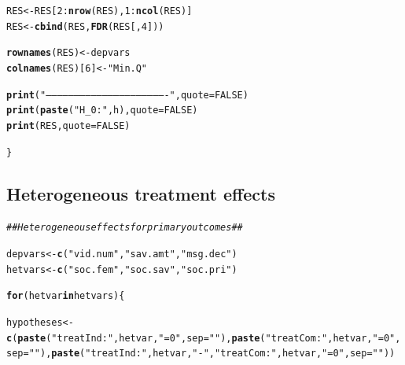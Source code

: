 \documentclass[11pt, a4paper]{article}\usepackage[]{graphicx}\usepackage[]{color}
\makeatletter
\newcommand{\hlnum}[1]{\textcolor[rgb]{0.686,0.059,0.569}{#1}}%
\newcommand{\hlstr}[1]{\textcolor[rgb]{0.192,0.494,0.8}{#1}}%
\newcommand{\hlcom}[1]{\textcolor[rgb]{0.678,0.584,0.686}{\textit{#1}}}%
\newcommand{\hlopt}[1]{\textcolor[rgb]{0,0,0}{#1}}%
\newcommand{\hlstd}[1]{\textcolor[rgb]{0.345,0.345,0.345}{#1}}%
\newcommand{\hlkwa}[1]{\textcolor[rgb]{0.161,0.373,0.58}{\textbf{#1}}}%
\newcommand{\hlkwb}[1]{\textcolor[rgb]{0.69,0.353,0.396}{#1}}%
\newcommand{\hlkwc}[1]{\textcolor[rgb]{0.333,0.667,0.333}{#1}}%
\newcommand{\hlkwd}[1]{\textcolor[rgb]{0.737,0.353,0.396}{\textbf{#1}}}%
\newenvironment{kframe}{%
 \def\at@end@of@kframe{}%
 \ifinner\ifhmode%
  \def\at@end@of@kframe{\end{minipage}}%
  \begin{minipage}{\columnwidth}%
 \fi\fi%
 \def\FrameCommand##1{\hskip\@totalleftmargin \hskip-\fboxsep
 \colorbox{shadecolor}{##1}\hskip-\fboxsep
     \hskip-\linewidth \hskip-\@totalleftmargin \hskip\columnwidth}%
 \MakeFramed {\advance\hsize-\width
   \@totalleftmargin\z@ \linewidth\hsize
   \@setminipage}}%
 {\par\unskip\endMakeFramed%
 \at@end@of@kframe}
\newenvironment{knitrout}{}{} %
\makeatother
\begin{document}
\begin{footnotesize}
\begin{knitrout}
\begin{kframe}
\begin{alltt}
        \hlstd{RES} \hlkwb{<-} \hlstd{RES[}\hlnum{2}\hlopt{:}\hlkwd{nrow}\hlstd{(RES),} \hlnum{1}\hlopt{:}\hlkwd{ncol}\hlstd{(RES)]}
        \hlstd{RES} \hlkwb{<-} \hlkwd{cbind}\hlstd{(RES,} \hlkwd{FDR}\hlstd{(RES[,} \hlnum{4}\hlstd{]))}

        \hlkwd{rownames}\hlstd{(RES)} \hlkwb{<-} \hlstd{depvars}
        \hlkwd{colnames}\hlstd{(RES)[}\hlnum{6}\hlstd{]} \hlkwb{<-} \hlstr{"Min. Q"}

        \hlkwd{print}\hlstd{(}\hlstr{"----------------------------------------------------------------"}\hlstd{,} \hlkwc{quote} \hlstd{=} \hlnum{FALSE}\hlstd{)}
        \hlkwd{print}\hlstd{(}\hlkwd{paste}\hlstd{(}\hlstr{"H_0:"}\hlstd{, h),} \hlkwc{quote} \hlstd{=} \hlnum{FALSE}\hlstd{)}
        \hlkwd{print}\hlstd{(RES,} \hlkwc{quote} \hlstd{=} \hlnum{FALSE}\hlstd{)}

    \hlstd{\}}
\end{alltt}
\end{kframe}
\end{knitrout}

    \subsection{Heterogeneous treatment effects}

\begin{knitrout}
\color{fgcolor}\begin{kframe}
\begin{alltt}
    \hlcom{## Heterogeneous effects for primary outcomes ##}

    \hlstd{depvars} \hlkwb{<-} \hlkwd{c}\hlstd{(}\hlstr{"vid.num"}\hlstd{,} \hlstr{"sav.amt"}\hlstd{,} \hlstr{"msg.dec"}\hlstd{)}
    \hlstd{hetvars} \hlkwb{<-} \hlkwd{c}\hlstd{(}\hlstr{"soc.fem"}\hlstd{,} \hlstr{"soc.sav"}\hlstd{,} \hlstr{"soc.pri"}\hlstd{)}

    \hlkwa{for} \hlstd{(hetvar} \hlkwa{in} \hlstd{hetvars) \{}

        \hlstd{hypotheses} \hlkwb{<-} \hlkwd{c}\hlstd{(}\hlkwd{paste}\hlstd{(}\hlstr{"treatInd:"}\hlstd{, hetvar,} \hlstr{" = 0"}\hlstd{,} \hlkwc{sep} \hlstd{=} \hlstr{""}\hlstd{),} \hlkwd{paste}\hlstd{(}\hlstr{"treatCom:"}\hlstd{, hetvar,} \hlstr{" = 0"}\hlstd{,} \hlkwc{sep} \hlstd{=} \hlstr{""}\hlstd{),} \hlkwd{paste}\hlstd{(}\hlstr{"treatInd:"}\hlstd{, hetvar,} \hlstr{" - "}\hlstd{,} \hlstr{"treatCom:"}\hlstd{, hetvar,} \hlstr{" = 0"}\hlstd{,} \hlkwc{sep} \hlstd{=} \hlstr{""}\hlstd{))}


\end{alltt}
\end{kframe}
\end{knitrout}
\end{footnotesize}
\end{document}
